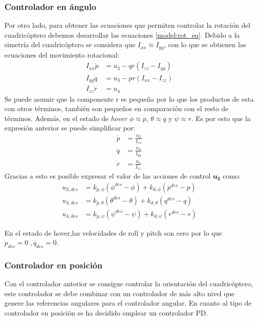 \subsubsection{Controlador en ángulo}
Por otro lado, para obtener las ecuaciones que permiten controlar la rotación del cuadricóptero debemos desarrollar las ecuaciones \ref{model:rot_eq}. Debido a la simetría del cuadricóptero se considera que $I_{xx} \approx I_{yy}$, con lo que se obtienen las ecuaciones del movimiento rotacional:
\begin{align}
	I_ {xx} \dot p &= u_2 - qr(I_{zz}-I_{yy})\nonumber\\
	I_ {yy} \dot q &= u_3 - pr(I_{xx}-I_{zz})\label{eq:control2}\\
	I_ {zz} \dot r &= u_4\nonumber
\end{align}
Se puede asumir que la componente r es pequeña por lo que los productos de esta con otros términos, también son pequeños en comparación con el resto de términos. Además, en el estado de \textit{hover} $\dot{\phi}\approx p$, $\dot{\theta}\approx q$ y $\dot{\psi}\approx r$. Es por esto que la expresión anterior se puede simplificar por:
\begin{align}
	\dot p &= \frac{u_2}{I_ {xx}} \nonumber\\
	\dot q &= \frac{u_3}{I_ {yy}}\label{eq:control3}\\
	\dot r &= \frac{u_4}{I_ {zz}}\nonumber
\end{align}
Gracias a esto es posible expresar el valor de las acciones de control $\mathbf{u_2}$ como:
\begin{align}
	\label{eq:u2_linearized}
	u_{2,des} &= k_{p,\phi}(\phi^{des}-\phi) + k_{d,\phi}(p^{des}-p)\\
	u_{3,des} &= k_{p,\theta}(\theta^{des}-\theta) + k_{d,\theta}(q^{des}-q)\\
	u_{4,des} &= k_{p,\psi}(\psi^{des}-\psi) + k_{d,\psi}(r^{des}-r)
\end{align}

En el estado de hover,las velocidades de roll y pitch son cero por lo que $p_{des} = 0\;, q_{des} = 0$.

\subsubsection{Controlador en posición}

Con el controlador anterior se consigue controlar la orientación del cuadricóptero, 
este controlador se debe combinar con un controlador de más alto nivel que genere las referencias angulares para el controlador angular.
En cuanto al tipo de controlador en posición se ha decidido emplear un controlador PD. 


